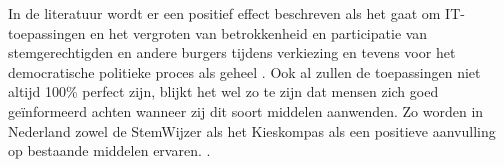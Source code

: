 In de literatuur wordt er een positief effect beschreven als het gaat om IT-toepassingen en het vergroten van betrokkenheid en participatie van stemgerechtigden en andere burgers tijdens verkiezing en tevens voor het democratische politieke proces als geheel \citep{drezner2008power,doostdar2004vulgar,gimmler2001deliberative}. Ook al zullen de toepassingen niet altijd 100\% perfect zijn, blijkt het wel zo te zijn dat mensen zich goed geïnformeerd achten wanneer zij dit soort middelen aanwenden. Zo worden in Nederland zowel de StemWijzer als het Kieskompas als een positieve aanvulling op bestaande middelen ervaren. \citep{van2013kieskompas}.










\iffalse
Deze sectie bestaat uit een aantal "blokken", waarin je per blok de relevante literatuur beschrijft. 

Neem alleen literatuur op die van belang is voor jouw onderzoeksvraag en deelvragen.

Typisch heb je 1 blok voor je hoofdvraag en per deelvraag \textbf{RQi} een blok. 


\subsection{RQ1}

\subsection{RQ2}
\fi